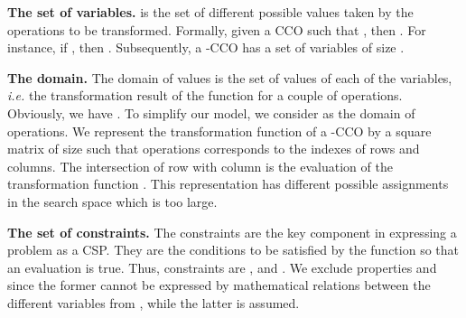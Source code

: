 \documentclass[submission,copyright,creativecommons]{eptcs}
\begin{document}
\medskip
\noindent\textbf{\textbf{The set of variables.}}
  is the set of different possible  values taken by the operations to be transformed. Formally, given a CCO  such that , then   . For instance, if , then . Subsequently, a -CCO has a set of variables   of size  .


\medskip
\noindent\textbf{\textbf{The domain.}} The domain of values is the set of values of each of the variables, \textit{i.e.} the transformation result of the  function for a couple of operations. Obviously,    we have . To simplify our model, we consider   as the domain of operations. We represent the transformation function   of a -CCO by a square matrix of size    such that operations corresponds to the indexes of rows and columns. The intersection of row  with column  is the evaluation of the transformation function .  This representation has    different possible assignments in the search space which is too large.

\medskip
\noindent\textbf{\textbf{The set of constraints.}}
The constraints are the key component in 
expressing a problem as a CSP. They are the conditions to be satisfied by the  function so that an evaluation is true. Thus,  constraints are  ,    and . We exclude   properties    and  since the former cannot be expressed by mathematical relations between the different variables from , while the latter is assumed. 
  
\end{document}
